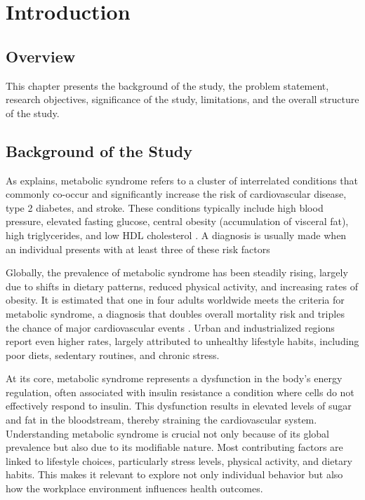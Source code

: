 \chapter{Introduction}

\section{Overview}
This chapter presents the background of the study, the problem statement, research objectives, significance of the study, limitations, and the overall structure of the study.

\section{Background of the Study}
As \citet{metabolicsyndrome_nodate} explains, metabolic syndrome refers to a cluster of interrelated conditions that commonly co-occur and significantly increase the risk of cardiovascular disease, type 2 diabetes, and stroke. These conditions typically include high blood pressure, elevated fasting glucose, central obesity (accumulation of visceral fat), high triglycerides, and low HDL cholesterol \citep{alberti2009harmonizing}. A diagnosis is usually made when an individual presents with at least three of these risk factors 

\par Globally, the prevalence of metabolic syndrome has been steadily rising, largely due to shifts in dietary patterns, reduced physical activity, and increasing rates of obesity. It is estimated that one in four adults worldwide meets the criteria for metabolic syndrome, a diagnosis that doubles overall mortality risk and triples the chance of major cardiovascular events \citep{idf2006_metabolic}. Urban and industrialized regions report even higher rates, largely attributed to unhealthy lifestyle habits, including poor diets, sedentary routines, and chronic stress.

\par At its core, metabolic syndrome represents a dysfunction in the body's energy regulation, often associated with insulin resistance a condition where cells do not effectively respond to insulin. This dysfunction results in elevated levels of sugar and fat in the bloodstream, thereby straining the cardiovascular system. Understanding metabolic syndrome is crucial not only because of its global prevalence but also due to its modifiable nature. Most contributing factors are linked to lifestyle choices, particularly stress levels, physical activity, and dietary habits. This makes it relevant to explore not only individual behavior but also how the workplace environment influences health outcomes.

